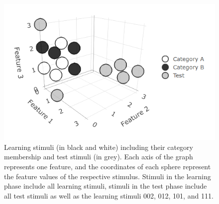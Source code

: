 \documentclass[a4paper,man,natbib]{apa6}
\begin{document}
\begin{figure}[htbp]
\centering
\includegraphics[width = \textwidth]{fig_environment.png}
\caption{Learning stimuli (in black and white) including their category membership and test stimuli (in grey). Each axis of the graph represents one feature, and the coordinates of each sphere represent the feature values of the respective stimulus. Stimuli in the learning phase include all learning stimuli, stimuli in the test phase include all test stimuli as well as the learning stimuli 002, 012, 101, and 111.}
\label{fig:environment}
\end{figure}
\end{document}

